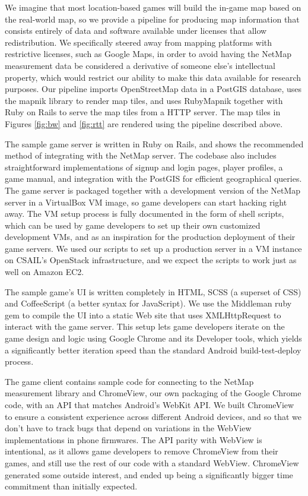 We imagine that most location-based games will build the in-game map based on
the real-world map, so we provide a pipeline for producing map information that
consists entirely of data and software available under licenses that allow
redistribution. We specifically steered away from mapping platforms with
restrictive licenses, such as Google Maps, in order to avoid having the NetMap
measurement data be considered a derivative of someone else's intellectual
property, which would restrict our ability to make this data available for
research purposes. Our pipeline imports OpenStreetMap data in a PostGIS
database, uses the mapnik library to render map tiles, and uses RubyMapnik
together with Ruby on Rails to serve the map tiles from a HTTP server. The map
tiles in Figures \ref{fig:bw} and \ref{fig:rtt} are rendered using the pipeline
described above.

The sample game server is written in Ruby on Rails, and shows the recommended
method of integrating with the NetMap server. The codebase also includes
straightforward implementations of signup and login pages, player profiles,
a game manual, and integration with the PostGIS for efficient geographical
queries. The game server is packaged together with a development version of the
NetMap server in a VirtualBox VM image, so game developers can start hacking
right away. The VM setup process is fully documented in the form of shell
scripts, which can be used by game developers to set up their own customized
development VMs, and as an inspiration for the production deployment of their
game servers. We used our scripts to set up a production server in a VM
instance on CSAIL's OpenStack infrastructure, and we expect the scripts to work
just as well on Amazon EC2.

The sample game's UI is written completely in HTML, SCSS (a superset of CSS)
and CoffeeScript (a better syntax for JavaScript). We use the Middleman ruby
gem to compile the UI into a static Web site that uses XMLHttpRequest to
interact with the game server. This setup lets game developers iterate on the
game design and logic using Google Chrome and its Developer tools, which yields
a significantly better iteration speed than the standard Android
build-test-deploy process.

The game client contains sample code for connecting to the NetMap measurement
library and ChromeView, our own packaging of the Google Chrome code, with an
API that matches Android's WebKit API. We built ChromeView to ensure a
consistent experience across different Android devices, and so that we don't
have to track bugs that depend on variations in the WebView implementations in
phone firmwares. The API parity with WebView is intentional, as it allows game
developers to remove ChromeView from their games, and still use the rest of our
code with a standard WebView. ChromeView generated some outside interest, and
ended up being a significantly bigger time commitment than initially expected.

